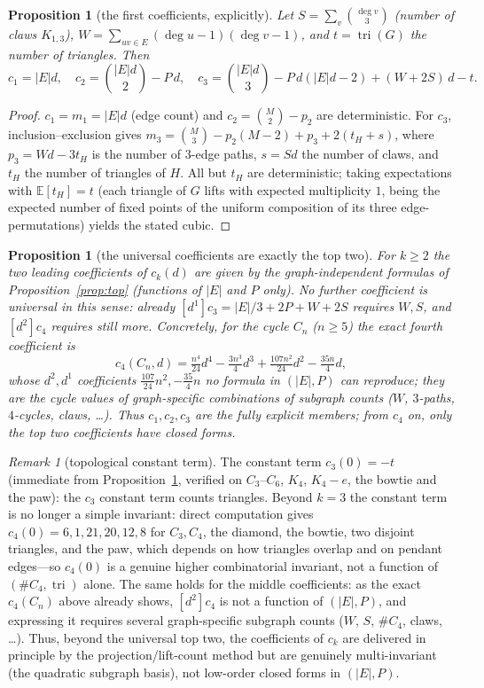 \documentclass[11pt]{article}
\newtheorem{proposition}[theorem]{Proposition}
\theoremstyle{remark}
\newtheorem{remark}[theorem]{Remark}
\newcommand{\E}{\mathbb{E}}
\DeclareMathOperator{\tri}{tri}
\begin{document}
\begin{proposition}[the first coefficients, explicitly]\label{prop:low}
Let $S=\sum_v\binom{\deg v}{3}$ (number of claws $K_{1,3}$),
$W=\sum_{uv\in E}(\deg u-1)(\deg v-1)$, and $t=\tri(G)$ the number of triangles.
Then
\[
c_1=|E|d,\quad
c_2=\binom{|E|d}{2}-P\,d,\quad
c_3=\binom{|E|d}{3}-P\,d(|E|d-2)+(W+2S)\,d-t .
\]
\end{proposition}

\begin{proof}
$c_1=m_1=|E|d$ (edge count) and $c_2=\binom{M}{2}-p_2$ are deterministic. For
$c_3$, inclusion--exclusion gives
$m_3=\binom{M}{3}-p_2(M-2)+p_3+2(t_H+s)$, where $p_3=W d-3t_H$ is the number of
$3$-edge paths, $s=S d$ the number of claws, and $t_H$ the number of triangles
of $H$. All but $t_H$ are deterministic; taking expectations with
$\E[t_H]=t$ (each triangle of $G$ lifts with expected multiplicity $1$, being
the expected number of fixed points of the uniform composition of its three
edge-permutations) yields the stated cubic.
\end{proof}

\begin{proposition}[the universal coefficients are exactly the top two]
For $k\ge 2$ the two leading coefficients of $c_k(d)$ are given by the
graph-independent formulas of Proposition~\ref{prop:top} (functions of $|E|$
and $P$ only). No further coefficient is universal in this sense: already
$[d^1]c_3 = |E|/3+2P+W+2S$ requires $W,S$, and $[d^2]c_4$ requires still more.
Concretely, for the cycle $C_n$ ($n\ge5$) the exact fourth coefficient is
\[
c_4(C_n,d)=\tfrac{n^4}{24}d^4-\tfrac{3n^3}{4}d^3+\tfrac{107n^2}{24}d^2
-\tfrac{35n}{4}d,
\]
whose $d^2,d^1$ coefficients $\tfrac{107}{24}n^2,-\tfrac{35}{4}n$ no formula in
$(|E|,P)$ can reproduce; they are the cycle values of graph-specific
combinations of subgraph counts ($W$, $3$-paths, $4$-cycles, claws, \dots).
Thus $c_1,c_2,c_3$ are the fully explicit members; from $c_4$ on, only the top
two coefficients have closed forms.
\end{proposition}

\begin{remark}[topological constant term]
The constant term $c_3(0)=-t$ (immediate from Proposition~\ref{prop:low},
verified on $C_3$--$C_6$, $K_4$, $K_4-e$, the bowtie and the paw): the $c_3$
constant term counts triangles. Beyond $k=3$ the constant term is no longer a
simple invariant: direct computation gives $c_4(0)=6,1,21,20,12,8$ for
$C_3, C_4$, the diamond, the bowtie, two disjoint triangles, and the paw,
which depends on how triangles overlap and on pendant edges---so $c_4(0)$ is a
genuine higher combinatorial invariant, not a function of $(\#C_4,\tri)$ alone.
The same holds for the middle coefficients: as the exact $c_4(C_n)$ above already
shows, $[d^2]c_4$ is not a function of $(|E|,P)$, and expressing it requires several
graph-specific subgraph counts ($W$, $S$, $\#C_4$, claws, \dots). Thus, beyond the
universal top two, the coefficients of $c_k$ are delivered in principle by the
projection/lift-count method but are genuinely multi-invariant (the quadratic
subgraph basis), not low-order closed forms in $(|E|,P)$.
\end{remark}
\end{document}
